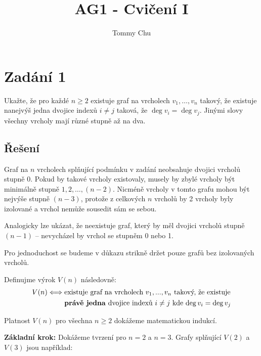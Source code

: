 \documentclass{article}
\title{AG1 - Cvičení I}
\author{Tommy Chu}
\date{}
\begin{document}
\maketitle

\section*{Zadání 1}

Ukažte, že pro každé $n \ge 2$ existuje graf na vrcholech $v_1, \dots, v_n$ takový, že existuje nanejvýš jedna dvojice indexů $i \ne j$ taková, že $\deg v_i = \deg v_j$. Jinými slovy všechny vrcholy mají různé stupně až na dva.

\subsection*{Řešení}

Graf na $n$ vrcholech splňující podmínku v zadání neobsahuje dvojici vrcholů stupně 0. Pokud by takové vrcholy existovaly, musely by zbylé vrcholy být minimálně stupně $1, 2, \dots, (n-2)$. Nicméně vrcholy v tomto grafu mohou být nejvýše stupně $(n-3)$, protože z celkových $n$ vrcholů by 2 vrcholy byly izolované a vrchol nemůže sousedit sám se sebou.

Analogicky lze ukázat, že neexistuje graf, který by měl dvojici vrcholů stupně $(n-1)$ -- nevycházel by vrchol se stupněm 0 nebo 1.

Pro jednoduchost se budeme v důkazu strikně držet pouze grafů bez izolovaných vrcholů.

Definujme výrok $V(n)$ následovně:
\begin{align*}
    V(n) \Longleftrightarrow \;
     & \text{existuje graf na vrcholech $v_1, . . . , v_n$ takový, že existuje}       \\
     & \text{\textbf{právě jedna} dvojice indexů $i \ne j$ kde $\deg v_i = \deg v_j$}
\end{align*}

Platnost $V(n)$ pro všechna $n \ge 2$ dokážeme matematickou indukcí.

\textbf{Základní krok:} Dokážeme tvrzení pro $n = 2$ a $n = 3$. Grafy splňující $V(2)$ a $V(3)$ jsou například:

\begin{center}
    \qquad
\end{center}
\end{document}
